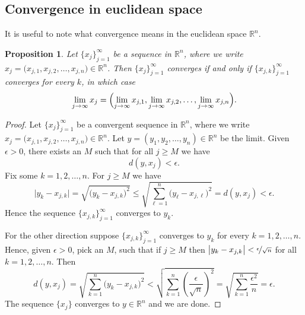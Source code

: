\documentclass[12pt]{book}
\newcommand{\R}{{\mathbb{R}}}
\theoremstyle{plain}
\newtheorem{prop}[thm]{Proposition}
\theoremstyle{remark}
\theoremstyle{definition}
\theoremstyle{exercise}
\theoremstyle{example}
\begin{document}
\subsection{Convergence in euclidean space}

It is useful to note what convergence means in the euclidean space
$\R^n$.

\begin{prop} \label{prop:msconveuc}
Let $\{ x_j \}_{j=1}^\infty$ be a sequence in $\R^n$,
where we write $x_j = \bigl(x_{j,1},x_{j,2},\ldots,x_{j,n}\bigr) \in \R^n$.
Then $\{ x_j \}_{j=1}^\infty$ converges if and only if
$\{ x_{j,k} \}_{j=1}^\infty$ converges for every $k$, in which case
\begin{equation*}
\lim_{j\to\infty}
x_j =
\Bigl(
\lim_{j\to\infty} x_{j,1},
\lim_{j\to\infty} x_{j,2},
\ldots,
\lim_{j\to\infty} x_{j,n}
\Bigr) .
\end{equation*}
\end{prop}


\begin{proof}
Let $\{ x_j \}_{j=1}^\infty$ be a convergent sequence
in $\R^n$, where we write $x_j = \bigl(x_{j,1},x_{j,2},\ldots,x_{j,n}\bigr) \in \R^n$.
Let $y = (y_1,y_2,\ldots,y_n) \in \R^n$ be the limit.
Given $\epsilon > 0$, there exists an $M$ such that for all
$j \geq M$ we have
\begin{equation*}
d(y,x_j) < \epsilon.
\end{equation*}
Fix some $k=1,2,\ldots,n$.  For $j \geq M$ we have
\begin{equation*}
\bigl\lvert y_k - x_{j,k} \bigr\rvert
=
\sqrt{{\bigl(y_k - x_{j,k} \bigr)}^2}
\leq
\sqrt{\sum_{\ell=1}^n {\bigl(y_\ell-x_{j,\ell}\bigr)}^2}
= d(y,x_j) < \epsilon .
\end{equation*}
Hence the sequence $\{ x_{j,k} \}_{j=1}^\infty$ converges to $y_k$.

For the other direction suppose 
$\{ x_{j,k} \}_{j=1}^\infty$ converges to $y_k$ for every $k=1,2,\ldots,n$.
Hence, given $\epsilon > 0$, pick an $M$, such that if $j \geq M$ then 
$\bigl\lvert y_k-x_{j,k} \bigr\rvert < \nicefrac{\epsilon}{\sqrt{n}}$ for all
$k=1,2,\ldots,n$.  Then
\begin{equation*}
d(y,x_j)
=
\sqrt{\sum_{k=1}^n {\bigl(y_k-x_{j,k}\bigr)}^2}
<
\sqrt{\sum_{k=1}^n {\left(\frac{\epsilon}{\sqrt{n}}\right)}^2}
=
\sqrt{\sum_{k=1}^n \frac{{\epsilon^2}}{n}}
= \epsilon .
\end{equation*}
The sequence $\{ x_j \}$ converges to $y \in \R^n$ and we are done.
\end{proof}
\end{document}
